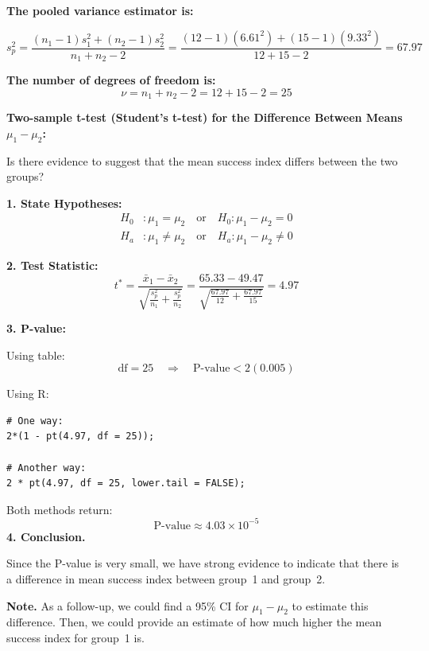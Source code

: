 \begin{example}
\vspace{1em}
\noindent\textbf{The pooled variance estimator is:}

\[
s_p^2 = \frac{(n_1 - 1)s_1^2 + (n_2 - 1)s_2^2}{n_1 + n_2 - 2} 
= \frac{(12 - 1)(6.61^2) + (15 - 1)(9.33^2)}{12 + 15 - 2}
= 67.97
\]

\vspace{1em}
\noindent\textbf{The number of degrees of freedom is:}
\[
\nu = n_1 + n_2 - 2 = 12 + 15 - 2 = 25
\]

\vspace{1em}
\noindent\textbf{Two-sample t-test (Student’s t-test) for the Difference Between Means $\mu_1 - \mu_2$:}

Is there evidence to suggest that the mean success index differs between the two groups?

\vspace{1em}
\noindent\textbf{1. State Hypotheses:}
\[
\begin{aligned}
H_0 &: \mu_1 = \mu_2 \quad \text{or} \quad H_0 : \mu_1 - \mu_2 = 0 \\
H_a &: \mu_1 \ne \mu_2 \quad \text{or} \quad H_a : \mu_1 - \mu_2 \ne 0
\end{aligned}
\]

\vspace{1em}
\noindent\textbf{2. Test Statistic:}
\[
t^* = \frac{\bar{x}_1 - \bar{x}_2}{\sqrt{\frac{s_p^2}{n_1} + \frac{s_p^2}{n_2}}}
= \frac{65.33 - 49.47}{\sqrt{\frac{67.97}{12} + \frac{67.97}{15}}}
= 4.97
\]

\vspace{1em}
\noindent\textbf{3. P-value:}

Using table:
\[
\text{df} = 25 \quad \Rightarrow \quad \text{P-value} < 2(0.005)
\]

Using R:
\begin{tcolorbox}[colback=gray!10, colframe=black!45, arc=2mm, before skip=4pt, after skip=4pt]
\begin{verbatim}
# One way:
2*(1 - pt(4.97, df = 25));

# Another way:
2 * pt(4.97, df = 25, lower.tail = FALSE);
\end{verbatim}
\end{tcolorbox}

Both methods return:
\[
\text{P-value} \approx 4.03 \times 10^{-5}
\]
\vspace{1em}
\noindent\textbf{4. Conclusion.}

Since the P-value is very small, we have strong evidence to indicate that there is a difference in mean success index between group~1 and group~2.

\vspace{0.5em}
\noindent\textbf{Note.} As a follow-up, we could find a 95\% CI for $\mu_1 - \mu_2$ to estimate this difference. Then, we could provide an estimate of how much higher the mean success index for group~1 is.

\end{example}
